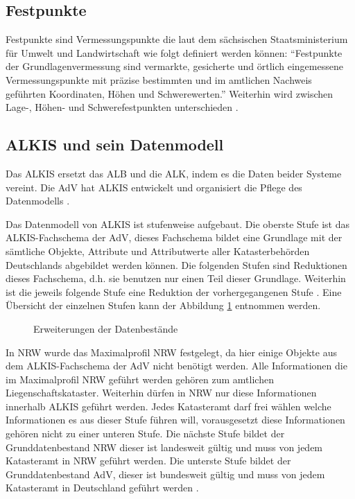 \subsection{Festpunkte}
Festpunkte sind Vermessungspunkte die laut dem sächsischen Staatsministerium für Umwelt und Landwirtschaft \autocite{sachsen-festpunkt} wie folgt definiert werden können:
\enquote{Festpunkte der Grundlagenvermessung sind vermarkte, gesicherte und örtlich eingemessene Vermessungspunkte mit präzise bestimmten und im amtlichen Nachweis geführten Koordinaten, Höhen und Schwerewerten.} Weiterhin wird zwischen Lage-, Höhen- und Schwerefestpunkten unterschieden \autocite[vgl.][]{adv-festpunkte}.

\subsection{ALKIS und sein Datenmodell}
Das \acf{ALKIS} ersetzt das \acf{ALB} und die \acf{ALK}, indem es die Daten beider Systeme vereint. Die \acs{AdV} hat \acs{ALKIS} entwickelt und organisiert die Pflege des Datenmodells \autocite[vgl.][]{adv-alkis}.

Das Datenmodell von ALKIS ist stufenweise aufgebaut. Die oberste Stufe ist das ALKIS-Fachschema der AdV, dieses Fachschema bildet eine Grundlage mit der sämtliche Objekte, Attribute und Attributwerte aller Katasterbehörden Deutschlands abgebildet werden können.
Die folgenden Stufen sind Reduktionen dieses Fachschema, d.h. sie benutzen nur einen Teil dieser Grundlage. Weiterhin ist die jeweils folgende Stufe eine Reduktion der vorhergegangenen Stufe \autocite[vgl.][1-4]{bezk-grunddaten}. Eine Übersicht der einzelnen Stufen kann der Abbildung \ref{fig:prod-stufen} entnommen werden. 

\begin{figure}[htbp]
	\centering
	\caption{Erweiterungen der Datenbestände}
	\label{fig:prod-stufen}
\end{figure}

In \ac{NRW} wurde das Maximalprofil NRW festgelegt, da hier einige Objekte aus dem ALKIS-Fachschema der AdV nicht benötigt werden. Alle Informationen die im Maximalprofil NRW geführt werden gehören zum amtlichen Liegenschaftskataster.
Weiterhin dürfen in NRW nur diese Informationen innerhalb ALKIS geführt werden. Jedes Katasteramt darf frei wählen welche Informationen es aus dieser Stufe führen will, vorausgesetzt diese Informationen gehören nicht zu einer unteren Stufe.
Die nächste Stufe bildet der Grunddatenbestand NRW dieser ist landesweit gültig und muss von jedem Katasteramt in NRW geführt werden.
Die unterste Stufe bildet der Grunddatenbestand AdV, dieser ist bundesweit gültig und muss von jedem Katasteramt in Deutschland geführt werden \autocite[vgl.][1-4]{bezk-grunddaten}.


